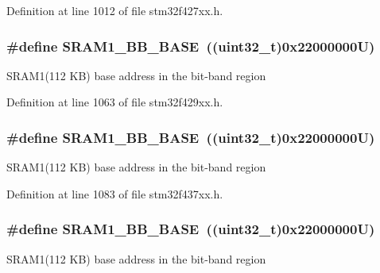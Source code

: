 Definition at line 1012 of file stm32f427xx.\+h.

\subsubsection[{\texorpdfstring{S\+R\+A\+M1\+\_\+\+B\+B\+\_\+\+B\+A\+SE}{SRAM1_BB_BASE}}]{\setlength{\rightskip}{0pt plus 5cm}\#define S\+R\+A\+M1\+\_\+\+B\+B\+\_\+\+B\+A\+SE~((uint32\+\_\+t)0x22000000\+U)}\hypertarget{group___peripheral__memory__map_gac4c4f61082e4b168f29d9cf97dc3ca5c}{}\label{group___peripheral__memory__map_gac4c4f61082e4b168f29d9cf97dc3ca5c}
S\+R\+A\+M1(112 K\+B) base address in the bit-\/band region 

Definition at line 1063 of file stm32f429xx.\+h.

\subsubsection[{\texorpdfstring{S\+R\+A\+M1\+\_\+\+B\+B\+\_\+\+B\+A\+SE}{SRAM1_BB_BASE}}]{\setlength{\rightskip}{0pt plus 5cm}\#define S\+R\+A\+M1\+\_\+\+B\+B\+\_\+\+B\+A\+SE~((uint32\+\_\+t)0x22000000\+U)}\hypertarget{group___peripheral__memory__map_gac4c4f61082e4b168f29d9cf97dc3ca5c}{}\label{group___peripheral__memory__map_gac4c4f61082e4b168f29d9cf97dc3ca5c}
S\+R\+A\+M1(112 K\+B) base address in the bit-\/band region 

Definition at line 1083 of file stm32f437xx.\+h.

\subsubsection[{\texorpdfstring{S\+R\+A\+M1\+\_\+\+B\+B\+\_\+\+B\+A\+SE}{SRAM1_BB_BASE}}]{\setlength{\rightskip}{0pt plus 5cm}\#define S\+R\+A\+M1\+\_\+\+B\+B\+\_\+\+B\+A\+SE~((uint32\+\_\+t)0x22000000\+U)}\hypertarget{group___peripheral__memory__map_gac4c4f61082e4b168f29d9cf97dc3ca5c}{}\label{group___peripheral__memory__map_gac4c4f61082e4b168f29d9cf97dc3ca5c}
S\+R\+A\+M1(112 K\+B) base address in the bit-\/band region 

